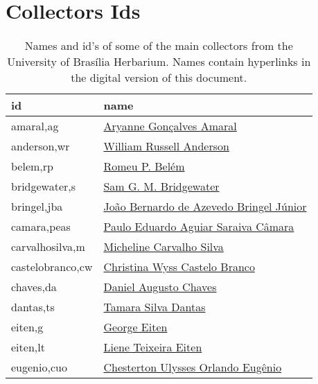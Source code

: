 \chapter{Collectors Ids}\label{appendix:collectors_ids}


\begin{longtable}{l l}
\caption[Names and id's of some of the main collectors from the University of Brasília Herbarium]{Names and id's of some of the main collectors from the University of Brasília Herbarium. Names contain hyperlinks in the digital version of this document.} \\
	  id & name \\
      \hline
amaral,ag           & \href{http://lattes.cnpq.br/0553088328180564}{Aryanne Gonçalves Amaral} \\
anderson,wr         & \href{https://plants.jstor.org/stable/10.5555/al.ap.person.bm000000177}{William Russell Anderson} \\             
belem,rp            & \href{https://plants.jstor.org/stable/10.5555/al.ap.person.bm000026951}{Romeu P. Belém} \\                       
bridgewater,s       & \href{https://plants.jstor.org/stable/10.5555/al.ap.person.bm000120171}{Sam G. M. Bridgewater} \\                
bringel,jba         & \href{http://lattes.cnpq.br/9359704960057451}{João Bernardo de Azevedo Bringel Júnior} \\
camara,peas         & \href{http://lattes.cnpq.br/2742831544064073}{Paulo Eduardo Aguiar Saraiva Câmara} \\
carvalhosilva,m     & \href{http://lattes.cnpq.br/1015868478480965}{Micheline Carvalho Silva} \\
castelobranco,cw    & \href{http://lattes.cnpq.br/6129052109183586}{Christina Wyss Castelo Branco} \\
chaves,da           & \href{http://lattes.cnpq.br/6993370381419092}{Daniel Augusto Chaves} \\
dantas,ts           & \href{http://lattes.cnpq.br/6233687711682398}{Tamara Silva Dantas} \\
eiten,g             & \href{https://plants.jstor.org/stable/10.5555/al.ap.person.bm000002352}{George Eiten} \\                         
eiten,lt            & \href{https://plants.jstor.org/stable/10.5555/al.ap.person.bm000002353}{Liene Teixeira Eiten} \\                 
eugenio,cuo         & \href{http://lattes.cnpq.br/3694741825113110}{Chesterton Ulysses Orlando Eugênio} \\

\end{longtable}
